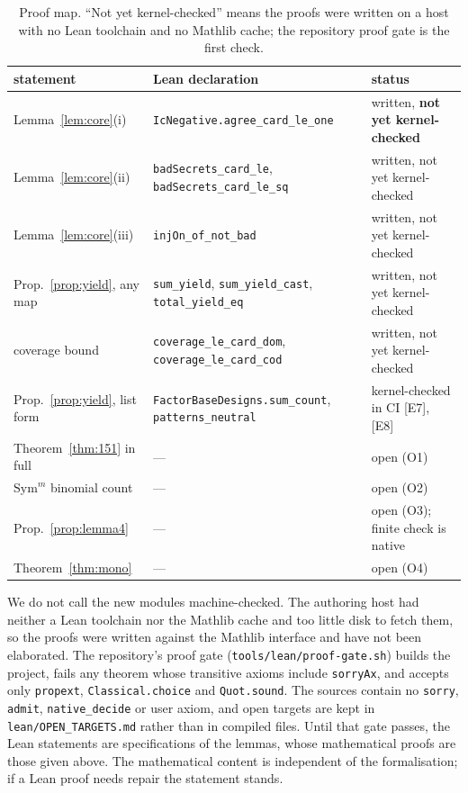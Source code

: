 \documentclass[10pt,a4paper]{article}
\newcommand{\ev}[1]{\textup{[#1]}}
\theoremstyle{definition}
\theoremstyle{remark}
\begin{document}
\begin{table}[t]
\centering\small
\begin{tabular}{@{}p{4.1cm} p{4.5cm} p{3.9cm}@{}}
\toprule
statement & Lean declaration & status \\
\midrule
Lemma~\ref{lem:core}(i) & \texttt{IcNegative.agree\_card\_le\_one} & written, \textbf{not yet kernel-checked} \\
Lemma~\ref{lem:core}(ii) & \texttt{badSecrets\_card\_le}, \texttt{badSecrets\_card\_le\_sq} & written, not yet kernel-checked \\
Lemma~\ref{lem:core}(iii) & \texttt{injOn\_of\_not\_bad} & written, not yet kernel-checked \\
Prop.~\ref{prop:yield}, any map & \texttt{sum\_yield}, \texttt{sum\_yield\_cast}, \texttt{total\_yield\_eq} & written, not yet kernel-checked \\
coverage bound & \texttt{coverage\_le\_card\_dom}, \texttt{coverage\_le\_card\_cod} & written, not yet kernel-checked \\
Prop.~\ref{prop:yield}, list form & \texttt{FactorBaseDesigns.}\allowbreak\texttt{sum\_count}, \texttt{patterns\_neutral} & kernel-checked in CI \ev{E7}, \ev{E8} \\
Theorem~\ref{thm:151} in full & --- & open (O1) \\
$\mathrm{Sym}^m$ binomial count & --- & open (O2) \\
Prop.~\ref{prop:lemma4} & --- & open (O3); finite check is native \\
Theorem~\ref{thm:mono} & --- & open (O4) \\
\bottomrule
\end{tabular}
\caption{Proof map. ``Not yet kernel-checked'' means the proofs were written on a
host with no Lean toolchain and no Mathlib cache; the repository proof gate is the
first check.}
\label{tab:proofmap}
\end{table}

We do not call the new modules machine-checked. The authoring host had neither a
Lean toolchain nor the Mathlib cache and too little disk to fetch them, so the proofs
were written against the Mathlib interface and have not been elaborated. The
repository's proof gate (\texttt{tools/lean/proof-gate.sh}) builds the project, fails
any theorem whose transitive axioms include \texttt{sorryAx}, and accepts only
\texttt{propext}, \texttt{Classical.choice} and \texttt{Quot.sound}. The sources contain
no \texttt{sorry}, \texttt{admit}, \texttt{native\_decide} or user axiom, and open
targets are kept in \texttt{lean/OPEN\_TARGETS.md} rather than in compiled files.
Until that gate passes, the Lean statements are specifications of the lemmas, whose
mathematical proofs are those given above. The mathematical content is independent of
the formalisation; if a Lean proof needs repair the statement stands.
\end{document}

